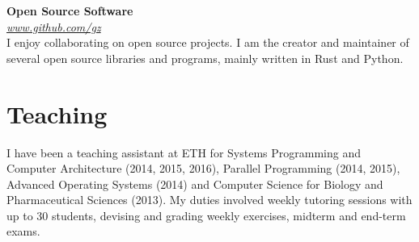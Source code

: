 \documentclass[margin,line]{cv/cv}
\begin{document}
\begin{resume}
    \textbf{Open Source Software} \\\vspace{1mm}%
    \textsl{\url{www.github.com/gz}} \hfill \\
    I enjoy collaborating on open source projects. I am the creator and maintainer
    of several open source libraries and programs, mainly written in Rust and
    Python.

    \section{\mysidestyle Teaching}

    I have been a teaching assistant at ETH for Systems Programming and Computer
    Architecture (2014, 2015, 2016), Parallel Programming (2014, 2015), Advanced
    Operating Systems (2014) and Computer Science for Biology and Pharmaceutical
    Sciences (2013). My duties involved weekly tutoring sessions with up to 30
    students, devising and grading weekly exercises, midterm and end-term exams.


\end{resume}
\end{document}
